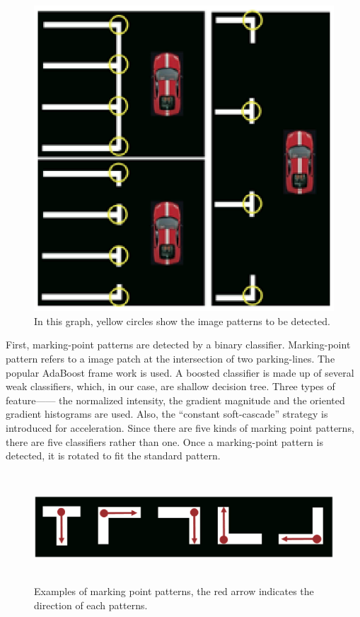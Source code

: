 \documentclass[journal]{IEEEtran}
\begin{document}
\begin{figure}
\centering
\includegraphics{pic/fig3_CNN_based_Parkinglot_Recognition}
\caption{
In this graph, yellow circles show the image patterns to be detected.\cite{Li2017Vision}
}\label{fig:3}
\end{figure}

First, marking-point patterns are detected by a binary classifier. 
Marking-point pattern refers to a image patch at the intersection of two parking-lines.
\cite{Li2017Vision} The popular AdaBoost frame work is used. 
A boosted classifier is made up of several weak classifiers, which, in our case, are shallow decision tree. 
Three types of feature—— the normalized intensity, the gradient magnitude and the oriented gradient histograms are used. 
Also, the “constant soft-cascade” strategy\cite{Li2017Vision} is introduced for acceleration. 
Since there are five kinds of marking point patterns, there are five classifiers rather than one. 
Once a marking-point pattern is detected, it is rotated to fit the standard pattern. 

\begin{figure}
\centering
\includegraphics[height = 1.6in]{pic/fig4_CNN_based_Parkinglot_Recognition}
\caption{
Examples of marking point patterns, the red arrow indicates the direction of each patterns.\cite{Li2017Vision}
}\label{fig:4}
\end{figure}
\end{document}
